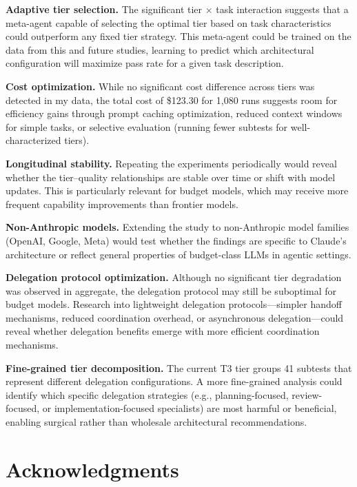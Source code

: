 \documentclass[11pt]{article}
\begin{document}
\textbf{Adaptive tier selection.} The significant tier $\times$ task
interaction suggests that a meta-agent capable of selecting the optimal tier
based on task characteristics could outperform any fixed tier strategy. This
meta-agent could be trained on the data from this and future studies,
learning to predict which architectural configuration will maximize pass rate
for a given task description.

\textbf{Cost optimization.} While no significant cost difference across tiers
was detected in my data, the total cost of \$123.30 for 1,080 runs suggests
room for efficiency gains through prompt caching optimization, reduced context
windows for simple tasks, or selective evaluation (running fewer subtests for
well-characterized tiers).

\textbf{Longitudinal stability.} Repeating the experiments periodically would
reveal whether the tier--quality relationships are stable over time or shift
with model updates. This is particularly relevant for budget models, which
may receive more frequent capability improvements than frontier models.

\textbf{Non-Anthropic models.} Extending the study to non-Anthropic model
families (OpenAI, Google, Meta) would test whether the findings are specific
to Claude's architecture or reflect general properties of budget-class LLMs
in agentic settings.

\textbf{Delegation protocol optimization.} Although no significant tier
degradation was observed in aggregate, the delegation protocol may still
be suboptimal for budget models. Research into lightweight delegation
protocols---simpler handoff mechanisms, reduced coordination overhead, or
asynchronous delegation---could reveal whether delegation benefits emerge
with more efficient coordination mechanisms.

\textbf{Fine-grained tier decomposition.} The current T3 tier groups 41
subtests that represent different delegation configurations. A more
fine-grained analysis could identify which specific delegation strategies
(e.g., planning-focused, review-focused, or implementation-focused specialists)
are most harmful or beneficial, enabling surgical rather than wholesale
architectural recommendations.

\section*{Acknowledgments}
\end{document}
